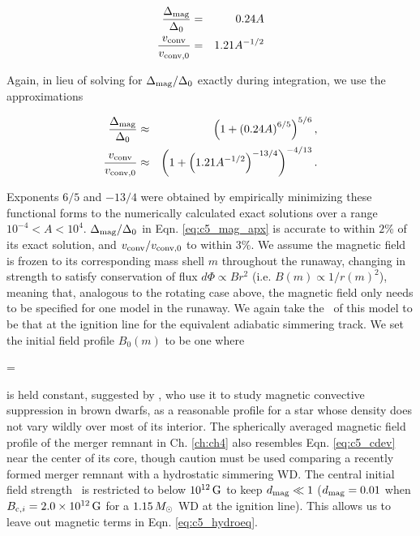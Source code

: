 
\begin{eqnarray}
\frac{\dnabmag}{\dnabconvzero} &=& 0.24A \nonumber \\
\frac{\vconv}{\vconvzero} &=& 1.21A^{-1/2}
\label{eq:c5_mag_exactsoln}
\end{eqnarray}

\noindent Again, in lieu of solving for $\dnabmag/\dnabconvzero$ exactly during integration, we use the approximations 

\begin{eqnarray}
\frac{\dnabmag}{\dnabconvzero} &\approx& \left(1 + \left(0.24A\right)^{6/5}\right)^{5/6}, \nonumber \\
\frac{\vconv}{\vconvzero} &\approx& \left(1 + \left(1.21A^{-1/2}\right)^{-13/4}\right)^{-4/13}.
\label{eq:c5_mag_apx}
\end{eqnarray}

\noindent Exponents $6/5$ and $-13/4$ were obtained by empirically minimizing these functional forms to the numerically calculated exact solutions over a range $10^{-4} < A < 10^4$.  $\dnabmag/\dnabconvzero$ in Eqn. \ref{eq:c5_mag_apx} is accurate to within $2$\% of its exact solution, and $\vconv/\vconvzero$ to within $3$\%.  We assume the magnetic field is frozen to its corresponding mass shell $m$ throughout the runaway, changing in strength to satisfy conservation of flux $d\Phi \propto B r^2$ (i.e. $B(m) \propto 1/r(m)^2$), meaning that, analogous to the rotating case above, the magnetic field only needs to be specified for one model in the runaway.  We again take the \Sc\ of this model to be that at the ignition line for the equivalent adiabatic simmering track.  We set the initial field profile $B_0(m)$ to be one where

\eqbegin
\dmag = 
\label{eq:c5_cdev}
\eqend


\noindent is held constant, suggested by \cite{macdm09}, who use it to study magnetic convective suppression in brown dwarfs, as a reasonable profile for a star whose density does not vary wildly over most of its interior.  The spherically averaged magnetic field profile of the merger remnant in Ch. \ref{ch:ch4} also resembles Eqn. \ref{eq:c5_cdev} near the center of its core, though caution must be used comparing a recently formed merger remnant with a hydrostatic simmering WD.  The central initial field strength \Binit\ is restricted to below $10^{12}\,\mathrm{G}$ to keep $\dmag \ll 1$ ($\dmag = 0.01$ when $\Binit = 2.0\times10^{12}\,\mrm{G}$ for a $1.15\,\Msun$ WD at the ignition line).  This allows us to leave out magnetic terms in Eqn. \ref{eq:c5_hydroeq}.

